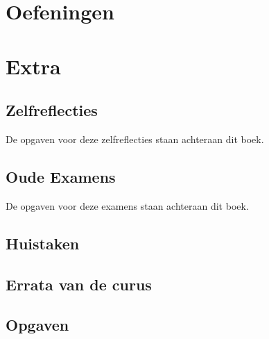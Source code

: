 \documentclass[a4paper,10pt,oneside]{book}
\begin{document}
\part{Oefeningen}







\part{Extra}





\chapter{Zelfreflecties}
De opgaven voor deze zelfreflecties staan achteraan dit boek.







\chapter{Oude Examens}
De opgaven voor deze examens staan achteraan dit boek.







\chapter{Huistaken}



\appendix
\chapter{Errata van de curus}


\chapter{Opgaven}












\end{document}
